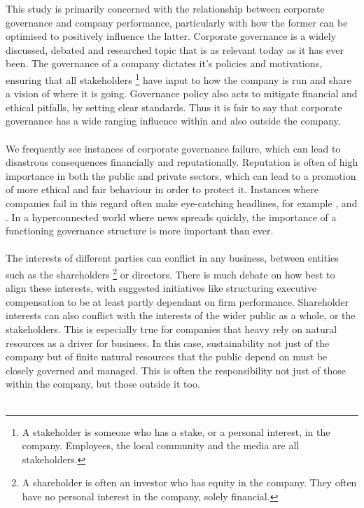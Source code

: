 {This study is primarily concerned with the relationship between corporate governance and company performance, particularly with how the former can be optimised to positively influence the latter. Corporate governance is a widely discussed, debated and researched topic that is as relevant today as it has ever been. The governance of a company dictates it's policies and motivations, ensuring that all stakeholders \footnote{A stakeholder is someone who has a stake, or a personal interest, in the company. Employees, the local community and the media are all stakeholders.} have input to how the company is run and share a vision of where it is going. Governance policy also acts to mitigate financial and ethical pitfalls, by setting clear standards. Thus it is fair to say that corporate governance has a wide ranging influence within and also outside the company.\\\\
We frequently see instances of corporate governance failure, which can lead to disastrous consequences financially and reputationally. Reputation is often of high importance in both the public and private sectors, which can lead to a promotion of more ethical and fair behaviour in order to protect it. Instances where companies fail in this regard often make eye-catching  headlines, for example \cite{cnnUnitedAirlines}, \cite{telegraphVolkswagon} and \cite{kirkpatrick2009corporate}. In a hyperconnected world where news spreads quickly, the importance of a functioning governance structure is more important than ever. \\\\
The interests of different parties can conflict in any business, between entities such as the shareholders \footnote{A shareholder is often an investor who has equity in the company. They often have no personal interest in the company, solely financial.} or directors. There is much debate on how best to align these interests, with suggested initiatives like structuring executive compensation to be at least partly dependant on firm performance. Shareholder interests can also conflict with the interests of the wider public as a whole, or the stakeholders. This is especially true for companies that heavy rely on natural resources as a driver for business. In this case, sustainability not just of the company but of finite natural resources that the public depend on must be closely governed and managed. This is often the responsibility not just of those within the company, but those outside it too.  \\\\
}
